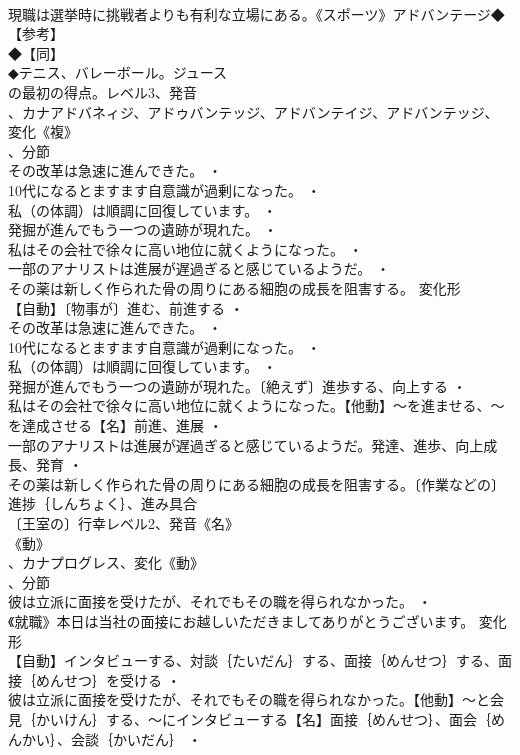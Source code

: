 \documentclass[8pt]{extreport}
\begin{document}
\begin{CJK}{UTF8}{min}
\\	現職は選挙時に挑戦者よりも有利な立場にある。《スポーツ》アドバンテージ◆【参考】
\\	◆【同】
\\	◆テニス、バレーボール。ジュース
\\	の最初の得点。レベル3、発音
\\	、カナアドバネィジ、アドゥバンテッジ、アドバンテイジ、アドバンテッジ、変化《複》
\\	、分節
\\	その改革は急速に進んできた。 ・
\\	10代になるとますます自意識が過剰になった。 ・
\\	私（の体調）は順調に回復しています。 ・
\\	発掘が進んでもう一つの遺跡が現れた。 ・
\\	私はその会社で徐々に高い地位に就くようになった。 ・
\\	一部のアナリストは進展が遅過ぎると感じているようだ。 ・
\\	その薬は新しく作られた骨の周りにある細胞の成長を阻害する。	変化形 
\\	【自動】〔物事が〕進む、前進する ・
\\	その改革は急速に進んできた。 ・
\\	10代になるとますます自意識が過剰になった。 ・
\\	私（の体調）は順調に回復しています。 ・
\\	発掘が進んでもう一つの遺跡が現れた。〔絶えず〕進歩する、向上する ・
\\	私はその会社で徐々に高い地位に就くようになった。【他動】～を進ませる、～を達成させる【名】前進、進展 ・
\\	一部のアナリストは進展が遅過ぎると感じているようだ。発達、進歩、向上成長、発育 ・
\\	その薬は新しく作られた骨の周りにある細胞の成長を阻害する。〔作業などの〕進捗｛しんちょく｝、進み具合
\\	〔王室の〕行幸レベル2、発音《名》
\\	《動》
\\	、カナプログレス、変化《動》
\\	、分節
\\	彼は立派に面接を受けたが、それでもその職を得られなかった。 ・
\\	《就職》本日は当社の面接にお越しいただきましてありがとうございます。	変化形 
\\	【自動】インタビューする、対談｛たいだん｝する、面接｛めんせつ｝する、面接｛めんせつ｝を受ける ・
\\	彼は立派に面接を受けたが、それでもその職を得られなかった。【他動】～と会見｛かいけん｝する、～にインタビューする【名】面接｛めんせつ｝、面会｛めんかい｝、会談｛かいだん｝ ・

\end{CJK}
\end{document}
